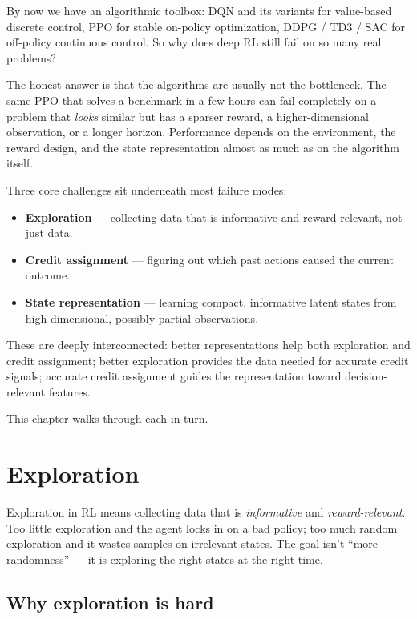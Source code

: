 \documentclass[11pt, oneside]{book}
\begin{document}
By now we have an algorithmic toolbox: DQN and its variants for value-based discrete
control, PPO for stable on-policy optimization, DDPG / TD3 / SAC for off-policy continuous
control. So why does deep RL still fail on so many real problems?

The honest answer is that the algorithms are usually not the bottleneck. The same
PPO that solves a benchmark in a few hours can fail completely on a problem that
\emph{looks} similar but has a sparser reward, a higher-dimensional observation, or a
longer horizon. Performance depends on the environment, the reward design, and the
state representation almost as much as on the algorithm itself.

Three core challenges sit underneath most failure modes:
\begin{itemize}
  \item \textbf{Exploration} --- collecting data that is informative and reward-relevant,
    not just data.
  \item \textbf{Credit assignment} --- figuring out which past actions caused the current
    outcome.
  \item \textbf{State representation} --- learning compact, informative latent states from
    high-dimensional, possibly partial observations.
\end{itemize}
These are deeply interconnected: better representations help both exploration and
credit assignment; better exploration provides the data needed for accurate credit
signals; accurate credit assignment guides the representation toward decision-relevant
features.

This chapter walks through each in turn.

\section{Exploration}

Exploration in RL means collecting data that is \emph{informative} and \emph{reward-relevant}.
Too little exploration and the agent locks in on a bad policy; too much random
exploration and it wastes samples on irrelevant states.
The goal isn't ``more randomness'' --- it is exploring the right states at the right
time.

\subsection{Why exploration is hard}
\end{document}
